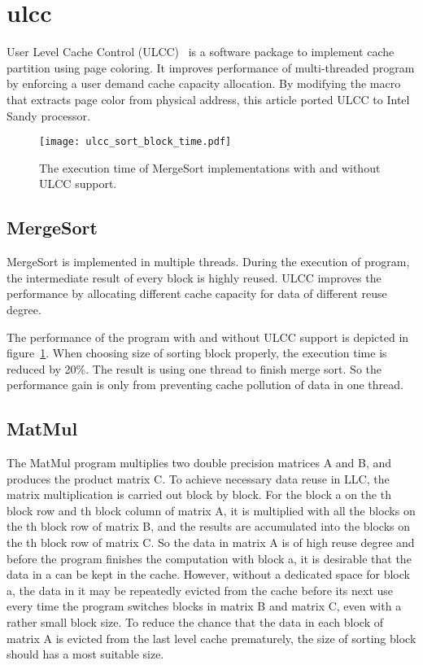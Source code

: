 \documentclass[conference]{IEEEtran}
\begin{document}
\section{ulcc}
User Level Cache Control (ULCC)~\cite{ding2011ulcc} is a software package to implement cache partition using page coloring. It improves performance of multi-threaded program by enforcing a user demand cache capacity allocation. By modifying the macro that extracts page color from physical address, this article ported ULCC to Intel Sandy processor.
\begin{figure}[!htbp]
\centering
\texttt{[image: ulcc\_sort\_block\_time.pdf]}
\caption{The execution time of MergeSort implementations with and without ULCC support.}
\label{fig:ULCCSortBlockTime}
\end{figure}
\subsection{MergeSort}
MergeSort is implemented in multiple threads. During the execution of program, the intermediate result of every block is highly reused. ULCC improves the performance by allocating different cache capacity for data of different reuse degree.

The performance of the program with and without ULCC support is depicted in figure~\ref{fig:ULCCSortBlockTime}. When choosing size of sorting block properly, the execution time is reduced by 20\%. The result is using one thread to finish merge sort. So the performance gain is only from preventing cache pollution of data in one thread.
\subsection{MatMul}
The MatMul program multiplies two double precision matrices A and B, and produces the product matrix C. To achieve necessary data reuse in LLC, the matrix multiplication is carried out block by block. For the block a on the th block row and th block column of matrix A, it is multiplied with all the blocks on the th block row of matrix B, and the results are accumulated into the blocks on the th block row of matrix C. So the data in matrix A is of high reuse degree and before the program finishes the computation with block a, it is desirable that the data in a can be kept in the cache. However, without a dedicated space for block a, the data in it may be repeatedly evicted from the cache before its next use every time the program switches blocks in matrix B and matrix C, even with a rather small block size. To reduce the chance that the data in each block of matrix A is evicted from the last level cache prematurely, the size of sorting block should has a most suitable size.
\end{document}
